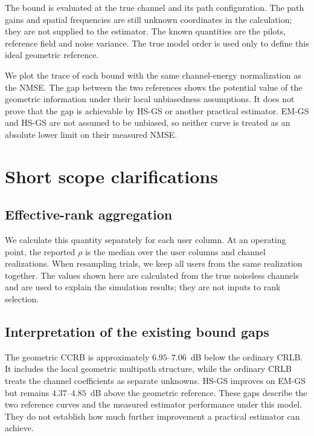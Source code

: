 \documentclass[11pt,a4paper]{article}
\begin{document}
The bound is evaluated at the true channel and its path configuration.
The path gains and spatial frequencies are still unknown coordinates in
the calculation; they are not supplied to the estimator. The known
quantities are the pilots, reference field and noise variance. The true
model order is used only to define this ideal geometric reference.

We plot the trace of each bound with the same channel-energy normalization
as the NMSE. The gap between the two references shows the potential value
of the geometric information under their local unbiasedness assumptions.
It does not prove that the gap is achievable by HS-GS or another practical
estimator. EM-GS and HS-GS are not assumed to be unbiased, so neither curve
is treated as an absolute lower limit on their measured NMSE.


\section{Short scope clarifications}
\subsection{Effective-rank aggregation}


We calculate this quantity separately for each user column. At an
operating point, the reported $\rho$ is the median over the user columns
and channel realizations. When resampling trials, we keep all users from
the same realization together. The values shown here are calculated from
the true noiseless channels and are used to explain the simulation results;
they are not inputs to rank selection.


\subsection{Interpretation of the existing bound gaps}


The geometric CCRB is approximately $6.95$--$7.06$~dB below the ordinary
CRLB. It includes the local geometric multipath structure, while the
ordinary CRLB treats the channel coefficients as separate unknowns.
HS-GS improves on EM-GS but remains $4.37$--$4.85$~dB above the geometric
reference. These gaps describe the two reference curves and the measured
estimator performance under this model. They do not establish how much
further improvement a practical estimator can achieve.
\end{document}

